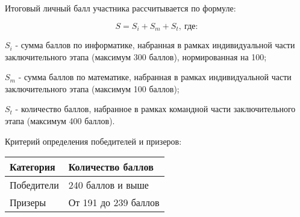 Итоговый личный балл участника рассчитывается по формуле:

$$S = S_i + S_m + S_t, \: \text{где:}$$
 
$S_i$ - сумма баллов по информатике, набранная в рамках индивидуальной части заключительного этапа (максимум 300 баллов), нормированная на 100;

$S_m$ - сумма баллов по математике, набранная в рамках индивидуальной части заключительного этапа (максимум 100 баллов);

$S_t$ - количество баллов, набранное в рамках командной части заключительного этапа (максимум 400 баллов).

Критерий определения победителей и призеров:
\begin{center}
    \begin{tabular}{|l|l|}
        \hline
        Категория&Количество баллов\\
        \hline
        Победители&240 баллов и выше\\
        \hline
        Призеры&От 191 до 239 баллов\\
        \hline
    \end{tabular}
\end{center}
